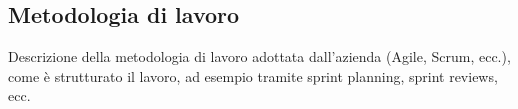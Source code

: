 \subsection{Metodologia di lavoro}
\label{sez:metodologia-lavoro}

Descrizione della metodologia di lavoro adottata dall'azienda (Agile, Scrum, ecc.), come è strutturato il lavoro, ad esempio tramite sprint planning, sprint reviews, ecc.\\